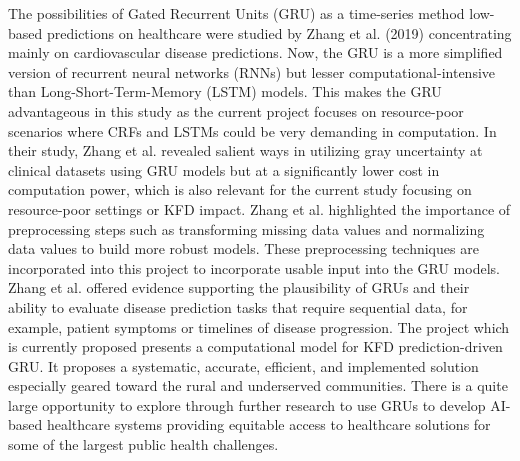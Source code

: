 \documentclass[conference]{IEEEtran}
\begin{document}
The possibilities of Gated Recurrent Units (GRU) as a time-series method low-based predictions on healthcare were studied by Zhang et al. (2019) concentrating mainly on cardiovascular disease predictions. Now, the GRU is a more simplified version of recurrent neural networks (RNNs) but lesser computational-intensive than Long-Short-Term-Memory (LSTM) models. This makes the GRU advantageous in this study as the current project focuses on resource-poor scenarios where CRFs and LSTMs could be very demanding in computation. In their study, Zhang et al. revealed salient ways in utilizing gray uncertainty at clinical datasets using GRU models but at a significantly lower cost in computation power, which is also relevant for the current study focusing on resource-poor settings or KFD impact. Zhang et al. highlighted the importance of preprocessing steps such as transforming missing data values and normalizing data values to build more robust models. These preprocessing techniques are incorporated into this project to incorporate usable input into the GRU models. Zhang et al. offered evidence supporting the plausibility of GRUs and their ability to evaluate disease prediction tasks that require sequential data, for example, patient symptoms or timelines of disease progression. The project which is currently proposed presents a computational model for KFD prediction-driven GRU. It proposes a systematic, accurate, efficient, and implemented solution especially geared toward the rural and underserved communities. There is a quite large opportunity to explore through further research to use GRUs to develop AI-based healthcare systems providing equitable access to healthcare solutions for some of the largest public health challenges.
\par\vspace{1em} 
\end{document}
